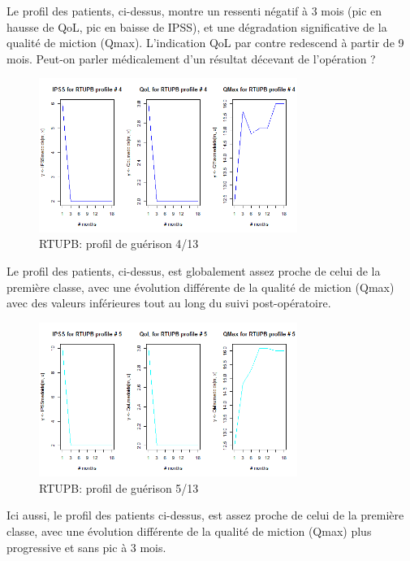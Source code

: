 Le profil des patients, ci-dessus, montre un ressenti négatif à 3 mois (pic en hausse de QoL, pic en baisse de IPSS), et une dégradation significative de la qualité de miction (Qmax). L'indication QoL par contre redescend à partir de 9 mois. Peut-on parler médicalement d'un résultat décevant de l'opération ?

\begin{figure}[H]
\centering
\includegraphics[width=0.75\textwidth]{../Fig/RTUPB/rtupb-profil-post-04.png}
\caption{RTUPB: profil de guérison 4/13}
\end{figure}

Le profil des patients, ci-dessus, est globalement assez proche de celui de la première classe, avec une évolution différente de la qualité de miction (Qmax) avec des valeurs inférieures tout au long du suivi post-opératoire.

\begin{figure}[H]
\centering
\includegraphics[width=0.75\textwidth]{../Fig/RTUPB/rtupb-profil-post-05.png}
\caption{RTUPB: profil de guérison 5/13}
\end{figure}

Ici aussi, le profil des patients ci-dessus, est assez proche de celui de la première classe, avec une évolution différente de la qualité de miction (Qmax) plus progressive et sans pic à 3 mois.

